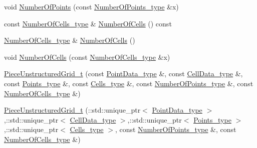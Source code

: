 \begin{DoxyCompactItemize}
\item 
void \hyperlink{classPieceUnstructuredGrid__t_a3e4e5defa42f9ecebb2016ca1d207700}{Number\+Of\+Points} (const \hyperlink{classPieceUnstructuredGrid__t_a8df1cd0d138d990e166d325ceed9a660}{Number\+Of\+Points\+\_\+type} \&x)
\item 
const \hyperlink{classPieceUnstructuredGrid__t_aeae5546900c50a4abe9b3aea485e97d0}{Number\+Of\+Cells\+\_\+type} \& \hyperlink{classPieceUnstructuredGrid__t_a6e395db39208cc81f9d7093c50d5d334}{Number\+Of\+Cells} () const 
\item 
\hyperlink{classPieceUnstructuredGrid__t_aeae5546900c50a4abe9b3aea485e97d0}{Number\+Of\+Cells\+\_\+type} \& \hyperlink{classPieceUnstructuredGrid__t_abe5f21a859d968d4b23a9b7ad790a7b3}{Number\+Of\+Cells} ()
\item 
void \hyperlink{classPieceUnstructuredGrid__t_a25296cecd9f9c30f8c75ed8b750c1ad7}{Number\+Of\+Cells} (const \hyperlink{classPieceUnstructuredGrid__t_aeae5546900c50a4abe9b3aea485e97d0}{Number\+Of\+Cells\+\_\+type} \&x)
\item 
\hyperlink{classPieceUnstructuredGrid__t_a9d30b76eb9efa7565011da966d5c0df7}{Piece\+Unstructured\+Grid\+\_\+t} (const \hyperlink{classPieceUnstructuredGrid__t_a5d79d8ea03ca53f80f24e62c2175ec02}{Point\+Data\+\_\+type} \&, const \hyperlink{classPieceUnstructuredGrid__t_a4232a7b88477ee6f692a4e5fab6a65d1}{Cell\+Data\+\_\+type} \&, const \hyperlink{classPieceUnstructuredGrid__t_a7747b159a3d1eee8d02a0eefaa235711}{Points\+\_\+type} \&, const \hyperlink{classPieceUnstructuredGrid__t_aca1ec38eff08bde0cd115c54dbb7a20f}{Cells\+\_\+type} \&, const \hyperlink{classPieceUnstructuredGrid__t_a8df1cd0d138d990e166d325ceed9a660}{Number\+Of\+Points\+\_\+type} \&, const \hyperlink{classPieceUnstructuredGrid__t_aeae5546900c50a4abe9b3aea485e97d0}{Number\+Of\+Cells\+\_\+type} \&)
\item 
\hyperlink{classPieceUnstructuredGrid__t_a76daa5e79a50b8d86dd39733313711e4}{Piece\+Unstructured\+Grid\+\_\+t} (\+::std\+::unique\+\_\+ptr$<$ \hyperlink{classPieceUnstructuredGrid__t_a5d79d8ea03ca53f80f24e62c2175ec02}{Point\+Data\+\_\+type} $>$,\+::std\+::unique\+\_\+ptr$<$ \hyperlink{classPieceUnstructuredGrid__t_a4232a7b88477ee6f692a4e5fab6a65d1}{Cell\+Data\+\_\+type} $>$,\+::std\+::unique\+\_\+ptr$<$ \hyperlink{classPieceUnstructuredGrid__t_a7747b159a3d1eee8d02a0eefaa235711}{Points\+\_\+type} $>$,\+::std\+::unique\+\_\+ptr$<$ \hyperlink{classPieceUnstructuredGrid__t_aca1ec38eff08bde0cd115c54dbb7a20f}{Cells\+\_\+type} $>$, const \hyperlink{classPieceUnstructuredGrid__t_a8df1cd0d138d990e166d325ceed9a660}{Number\+Of\+Points\+\_\+type} \&, const \hyperlink{classPieceUnstructuredGrid__t_aeae5546900c50a4abe9b3aea485e97d0}{Number\+Of\+Cells\+\_\+type} \&)

\end{DoxyCompactItemize}
